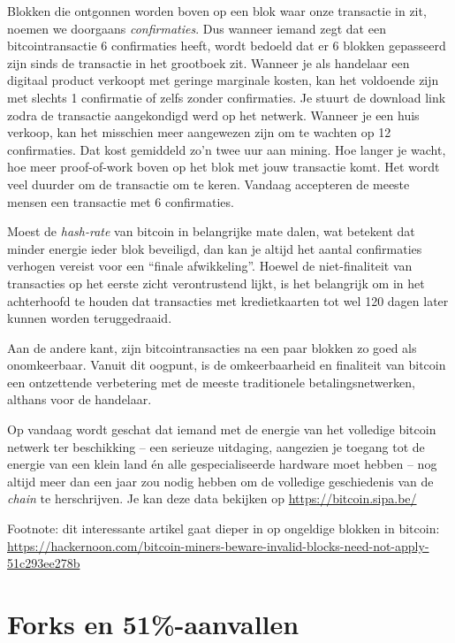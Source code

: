 \documentclass[
  letterpaper,
]{scrbook}
\begin{document}
Blokken die ontgonnen worden boven op een blok waar onze transactie in
zit, noemen we doorgaans \emph{confirmaties}. Dus wanneer iemand zegt
dat een bitcointransactie 6 confirmaties heeft, wordt bedoeld dat er 6
blokken gepasseerd zijn sinds de transactie in het grootboek zit.
Wanneer je als handelaar een digitaal product verkoopt met geringe
marginale kosten, kan het voldoende zijn met slechts 1 confirmatie of
zelfs zonder confirmaties. Je stuurt de download link zodra de
transactie aangekondigd werd op het netwerk. Wanneer je een huis
verkoop, kan het misschien meer aangewezen zijn om te wachten op 12
confirmaties. Dat kost gemiddeld zo'n twee uur aan mining. Hoe langer je
wacht, hoe meer proof-of-work boven op het blok met jouw transactie
komt. Het wordt veel duurder om de transactie om te keren. Vandaag
accepteren de meeste mensen een transactie met 6 confirmaties.

Moest de \emph{hash-rate} van bitcoin in belangrijke mate dalen, wat
betekent dat minder energie ieder blok beveiligd, dan kan je altijd het
aantal confirmaties verhogen vereist voor een ``finale afwikkeling''.
Hoewel de niet-finaliteit van transacties op het eerste zicht
verontrustend lijkt, is het belangrijk om in het achterhoofd te houden
dat transacties met kredietkaarten tot wel 120 dagen later kunnen worden
teruggedraaid.

Aan de andere kant, zijn bitcointransacties na een paar blokken zo goed
als onomkeerbaar. Vanuit dit oogpunt, is de omkeerbaarheid en finaliteit
van bitcoin een ontzettende verbetering met de meeste traditionele
betalingsnetwerken, althans voor de handelaar.

Op vandaag wordt geschat dat iemand met de energie van het volledige
bitcoin netwerk ter beschikking -- een serieuze uitdaging, aangezien je
toegang tot de energie van een klein land én alle gespecialiseerde
hardware moet hebben -- nog altijd meer dan een jaar zou nodig hebben om
de volledige geschiedenis van de \emph{chain} te herschrijven. Je kan
deze data bekijken op \url{https://bitcoin.sipa.be/}

Footnote: dit interessante artikel gaat dieper in op ongeldige blokken
in bitcoin:
\url{https://hackernoon.com/bitcoin-miners-beware-invalid-blocks-need-not-apply-51c293ee278b}


\hypertarget{forks-en-51-aanvallen}{%
\chapter{Forks en 51\%-aanvallen}\label{forks-en-51-aanvallen}}
\end{document}
